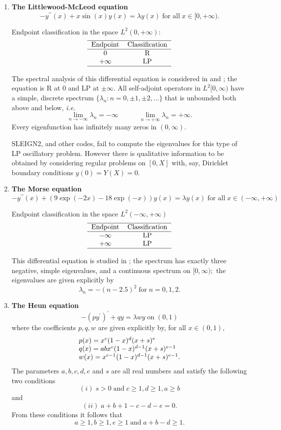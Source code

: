 \documentclass[12pt]{amsart}%
\theoremstyle{plain}
\numberwithin{equation}{section}
\begin{document}
\begin{enumerate}
\item \textbf{The Littlewood-McLeod equation}%
\[
-y^{\prime\prime}(x)+x\sin(x)y(x)=\lambda y(x)\;\text{for all}\;x\in
\lbrack0,+\infty).
\]

Endpoint classification in the space $L^{2}(0,+\infty)$:%
\[%
\begin{tabular}
[c]{cc}\hline
Endpoint & Classification\\\hline
$0$ & R\\
$+\infty$ & LP\\\hline
\end{tabular}
\]

The spectral analysis of this differential equation is considered in
\cite{JEL} and \cite{JBM}; the equation is R at $0$ and LP at $\pm\infty.$ All
self-adjoint operators in $L^{2}[0,\infty)$ have a simple, discrete spectrum
$\{\lambda_{n}:n=0,\pm1,\pm2,\ldots\}$ that is unbounded both above and below,
\textit{i.e.}%
\[
\lim_{n\rightarrow-\infty}\lambda_{n}=-\infty\quad\quad\quad\lim
_{n\rightarrow+\infty}\lambda_{n}=+\infty.
\]
Every eigenfunction has infinitely many zeros in $(0,\infty).$

SLEIGN2, and other codes, fail to compute the eigenvalues for this type of LP
oscillatory problem. However there is qualitative information to be obtained
by considering regular problems on $[0,X]$ with, say, Dirichlet boundary
conditions $y(0)=Y(X)=0.$

\item \textbf{The Morse equation}%
\[
-y^{\prime\prime}(x)+(9\exp(-2x)-18\exp(-x))y(x)=\lambda y(x)\;\text{for
all}\;x\in(-\infty,+\infty)
\]

Endpoint classification in the space $L^{2}(-\infty,+\infty)$%
\[%
\begin{tabular}
[c]{cc}\hline
Endpoint & Classification\\\hline
$-\infty$ & LP\\
$+\infty$ & LP\\\hline
\end{tabular}
\]

This differential equation is studied in \cite[Example 6]{PBB1}; the spectrum
has exactly three negative, simple eigenvalues, and a continuous spectrum on
$[0,\infty);$ the eigenvalues are given explicitly by%
\[
\lambda_{n}=-(n-2.5)^{2}\;\text{for}\;n=0,1,2.
\]

\item \textbf{The Heun equation}%
\[
-(py^{\prime})^{\prime}+qy=\lambda wy\;\text{on}\;(0,1)
\]
where the coefficients $p,q,w$ are given explicitly by, for all $x\in(0,1),$%
\[%
\begin{array}
[c]{l}%
p(x)=x^{c}(1-x)^{d}(x+s)^{e}\\
q(x)=abx^{c}(1-x)^{d-1}(x+s)^{e-1}\\
w(x)=x^{c-1}(1-x)^{d-1}(x+s)^{e-1}.
\end{array}
\]
The parameters $a,b,c,d,e$ and $s$ are all real numbers and satisfy the
following two conditions%
\[
(i)\;s>0\;\text{and}\;c\geq1,d\geq1,a\geq b
\]
and%
\[
(ii)\;a+b+1-c-d-e=0.
\]
From these conditions it follows that%
\[
a\geq1,b\geq1,e\geq1\;\text{and}\;a+b-d\geq1.
\]


\end{enumerate}
\end{document}
